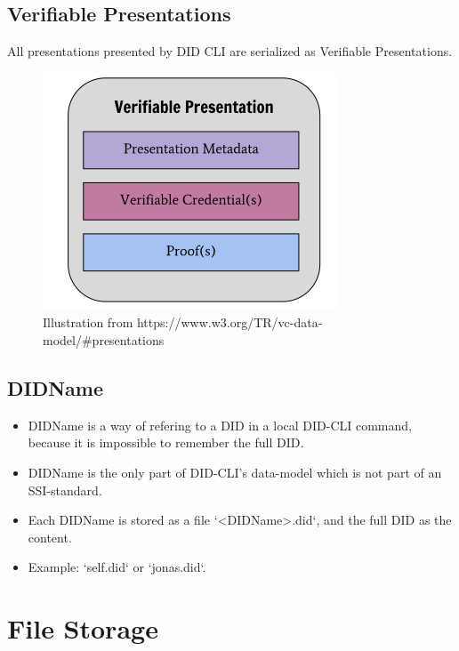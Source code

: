 \newpage

\subsection{Verifiable Presentations}

All presentations presented by DID CLI are serialized as Verifiable Presentations.
    
    \begin{figure}[htbp]
      \centering
      \includegraphics[width=.7\textwidth]{figures/presentation.png}
      \caption[]{Illustration from https://www.w3.org/TR/vc-data-model/#presentations}
    \end{figure}
    


\subsection{DIDName}
\begin{itemize}
    \item DIDName is a way of refering to a DID in a local DID-CLI command, because it is impossible to remember the full DID.
    \item DIDName is the only part of DID-CLI's data-model which is not part of an SSI-standard.
    \item Each DIDName is stored as a file `<DIDName>.did`, and the full DID as the content.
    \item Example: `self.did` or `jonas.did`.
\end{itemize}




\newpage


\section{File Storage}

